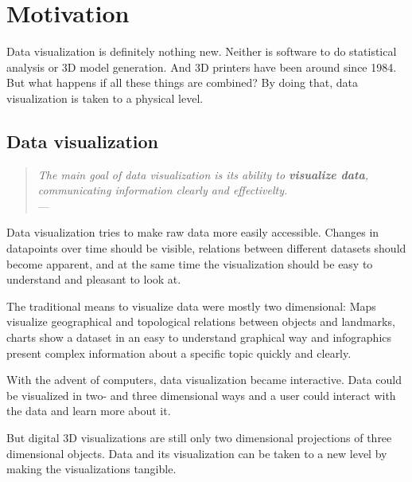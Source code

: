 
\chapter{Motivation}

\label{ch:motivation} %


Data visualization is definitely nothing new. Neither is software to do
statistical analysis or 3D model generation. And 3D printers have been around
since 1984. But what happens if all these things are combined? By doing that,
data visualization is taken to a physical level.


\section{Data visualization}\label{sec:datavis}

\begin{quote}{\slshape
The main goal of data visualization is its ability to \textbf{visualize data},
communicating information clearly and effectivelty.} \\ \medskip
---  \citep{friedman:2008}
\end{quote}

Data visualization tries to make raw data more easily accessible. Changes in
datapoints over time should be visible, relations between different datasets
should become apparent, and at the same time the visualization should be easy to
understand and pleasant to look at.

The traditional means to visualize data were mostly two dimensional: Maps
visualize geographical and topological relations between objects and landmarks,
charts show a dataset in an easy to understand graphical way and infographics
present complex information about a specific topic quickly and clearly.

With the advent of computers, data visualization became interactive. Data could
be visualized in two- and three dimensional ways and a user could interact with
the data and learn more about it.

But digital 3D visualizations are still only two dimensional projections of
three dimensional objects. Data and its visualization can be taken to a new
level by making the visualizations tangible.

